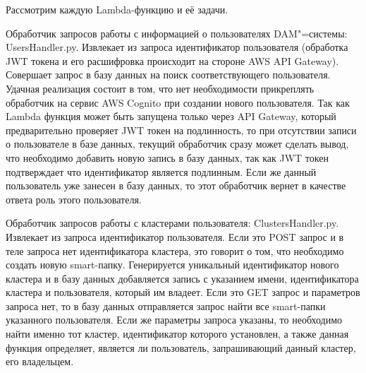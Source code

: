 Рассмотрим каждую Lambda-функцию и её задачи.

Обработчик запросов работы с информацией о пользователях DAM"=системы: UsersHandler.py. Извлекает из запроса идентификатор пользователя (обработка JWT токена и его расшифровка происходит на стороне AWS API Gateway). Совершает запрос в базу данных на поиск соответствующего пользователя. Удачная реализация состоит в том, что нет необходимости прикреплять обработчик на сервис AWS Cognito при создании нового пользователя. Так как Lambda функция может быть запущена только через API Gateway, который предварительно проверяет JWT токен на подлинность, то при отсутствии записи о пользователе в базе данных, текущий обработчик сразу может сделать вывод, что необходимо добавить новую запись в базу данных, так как JWT токен подтверждает что идентификатор является подлинным. Если же данный пользователь уже занесен в базу данных, то этот обработчик вернет в качестве ответа роль этого пользователя.

Обработчик запросов работы с кластерами пользователя: ClustersHandler.py. Извлекает из запроса идентификатор пользователя. Если это POST запрос и в теле запроса нет идентификатора кластера, это говорит о том, что необходимо создать новую smart-папку. Генерируется уникальный идентификатор нового кластера и в базу данных добавляется запись с указанием имени, идентификатора кластера и пользователя, который им владеет. Если это GET запрос и параметров запроса нет, то в базу данных отправляется запрос найти все smart-папки указанного пользователя. Если же параметры запроса указаны, то необходимо найти именно тот кластер, идентификатор которого установлен, а также данная функция определяет, является ли пользователь, запрашивающий данный кластер, его владельцем.

